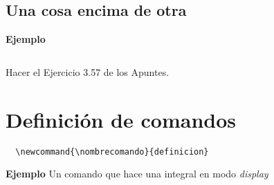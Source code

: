 \documentclass[11pt,a4paper]{report}
\begin{document}
\subsection{Una cosa encima de otra}





\bigskip
\textbf{Ejemplo}

\begin{equation*}
\end{equation*}

\bigskip





\bigskip
 Hacer el Ejercicio 3.57 de los Apuntes.



\bigskip





\section{Definición de comandos}





%
\begin{verbatim}
  \newcommand{\nombrecomando}{definicion} 
\end{verbatim}
%





\bigskip
\textbf{Ejemplo} Un comando que hace una integral en modo \emph{display}



\bigskip
\end{document}
